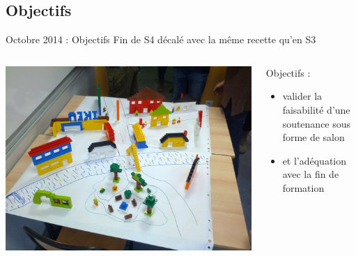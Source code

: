 \documentclass{beamer}
\begin{document}
\subsection{Objectifs}
\begin{frame}{Octobre 2014 : Objectifs}
  Fin de S4 décalé avec la même recette qu'en S3 
  \begin{columns}
    \begin{column}{0.5\textwidth}
      \begin{center}
        \includegraphics[width=\textwidth]{includes/201410_lego.jpg}      
      \end{center}
    \end{column}
    \begin{column}{0.5\textwidth}
      Objectifs : 
      \begin{itemize}
        \item valider la faisabilité d'une soutenance sous forme de salon 
        \item et l'adéquation avec la fin de formation
      \end{itemize}
    \end{column}
  \end{columns}
\end{frame}
\end{document}
